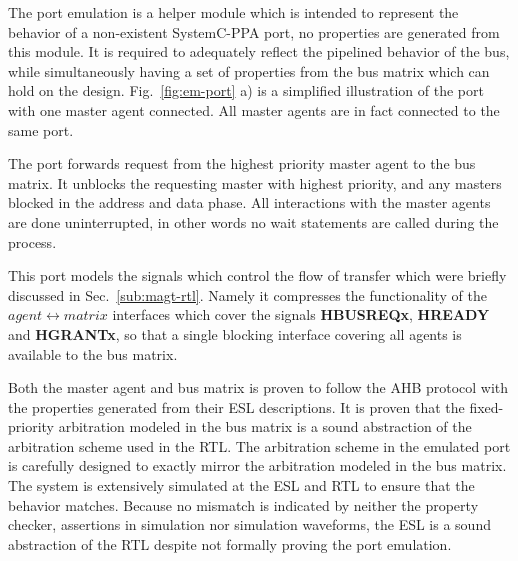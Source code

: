 The port emulation is a helper module which is intended to represent the behavior of a non-existent SystemC-PPA port, no properties are generated from this module. It is required to adequately reflect the pipelined behavior of the bus, while simultaneously having a set of properties from the bus matrix which can hold on the design. Fig.~\ref{fig:em-port} a) is a simplified illustration of the port with one master agent connected. All master agents are in fact connected to the same port. \par
The port forwards request from the highest priority master agent to the bus matrix. It unblocks the requesting master with highest priority, and any masters blocked in the address and data phase. All interactions with the master agents are done uninterrupted, in other words no wait statements are called during the process. \par
This port models the signals which control the flow of transfer which were briefly discussed in Sec.~\ref{sub:magt-rtl}. Namely it compresses the functionality of the $agent\leftrightarrow matrix$ interfaces which cover the signals \textbf{HBUSREQx}, \textbf{HREADY} and \textbf{HGRANTx}, so that a single blocking interface covering all agents is available to the bus matrix. \par
Both the master agent and bus matrix is proven to follow the AHB protocol with the properties generated from their ESL descriptions. It is proven that the fixed-priority arbitration modeled in the bus matrix is a sound abstraction of the arbitration scheme used in the RTL. The arbitration scheme in the emulated port is carefully designed to exactly mirror the arbitration modeled in the bus matrix. The system is extensively simulated at the ESL and RTL to ensure that the behavior matches. Because no mismatch is indicated by neither the property checker, assertions in simulation nor simulation waveforms, the ESL is a sound abstraction of the RTL despite not formally proving the port emulation.  





